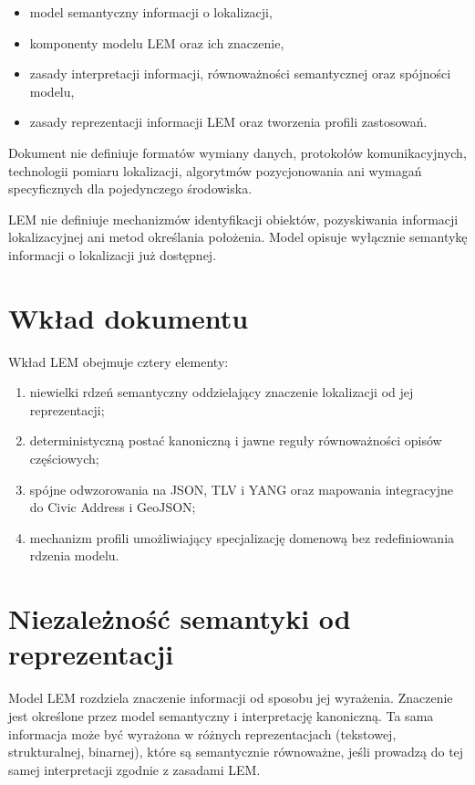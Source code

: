 \begin{itemize}
    \item model semantyczny informacji o lokalizacji,
    \item komponenty modelu LEM oraz ich znaczenie,
    \item zasady interpretacji informacji, równoważności semantycznej oraz spójności modelu,
    \item zasady reprezentacji informacji LEM oraz tworzenia profili zastosowań.
\end{itemize}

Dokument nie definiuje formatów wymiany danych, protokołów komunikacyjnych, technologii pomiaru lokalizacji, algorytmów pozycjonowania ani wymagań specyficznych dla pojedynczego środowiska.

LEM nie definiuje mechanizmów identyfikacji obiektów, pozyskiwania informacji lokalizacyjnej ani metod określania położenia. Model opisuje wyłącznie semantykę informacji o lokalizacji już dostępnej.

\section{Wkład dokumentu}
\label{sec:wklad}
Wkład LEM obejmuje cztery elementy:
\begin{enumerate}
    \item niewielki rdzeń semantyczny oddzielający znaczenie lokalizacji od jej reprezentacji;
    \item deterministyczną postać kanoniczną i jawne reguły równoważności opisów częściowych;
    \item spójne odwzorowania na JSON, TLV i YANG oraz mapowania integracyjne do Civic Address i GeoJSON;
    \item mechanizm profili umożliwiający specjalizację domenową bez redefiniowania rdzenia modelu.
\end{enumerate}

\section{Niezależność semantyki od reprezentacji}
\label{sec:niezaleznosc}
Model LEM rozdziela znaczenie informacji od sposobu jej wyrażenia. Znaczenie jest określone przez model semantyczny i interpretację kanoniczną. Ta sama informacja może być wyrażona w różnych reprezentacjach (tekstowej, strukturalnej, binarnej), które są semantycznie równoważne, jeśli prowadzą do tej samej interpretacji zgodnie z zasadami LEM.

